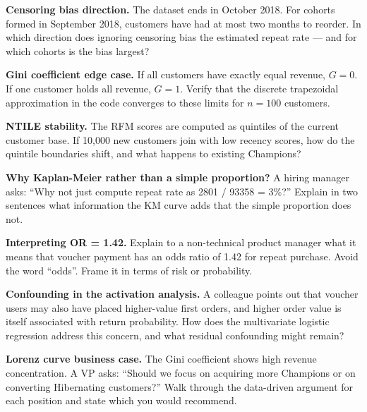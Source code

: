 \begin{challengebox}
\textbf{Censoring bias direction.} The dataset ends in October 2018. For cohorts
formed in September 2018, customers have had at most two months to reorder. In
which direction does ignoring censoring bias the estimated repeat rate --- and
for which cohorts is the bias largest?
\end{challengebox}

\begin{challengebox}
\textbf{Gini coefficient edge case.} If all customers have exactly equal revenue,
$G = 0$. If one customer holds all revenue, $G = 1$. Verify that the discrete
trapezoidal approximation in the code converges to these limits for $n = 100$
customers.
\end{challengebox}

\begin{challengebox}
\textbf{NTILE stability.} The RFM scores are computed as quintiles of the current
customer base. If 10,000 new customers join with low recency scores, how do the
quintile boundaries shift, and what happens to existing Champions?
\end{challengebox}

\begin{interviewbox}
\textbf{Why Kaplan-Meier rather than a simple proportion?} A hiring manager asks:
``Why not just compute repeat rate as 2801 / 93358 = 3\%?'' Explain in two sentences
what information the KM curve adds that the simple proportion does not.
\end{interviewbox}

\begin{interviewbox}
\textbf{Interpreting OR = 1.42.} Explain to a non-technical product manager what
it means that voucher payment has an odds ratio of 1.42 for repeat purchase.
Avoid the word ``odds''. Frame it in terms of risk or probability.
\end{interviewbox}

\begin{interviewbox}
\textbf{Confounding in the activation analysis.} A colleague points out that
voucher users may also have placed higher-value first orders, and higher order
value is itself associated with return probability. How does the multivariate
logistic regression address this concern, and what residual confounding might
remain?
\end{interviewbox}

\begin{interviewbox}
\textbf{Lorenz curve business case.} The Gini coefficient shows high revenue
concentration. A VP asks: ``Should we focus on acquiring more Champions or on
converting Hibernating customers?'' Walk through the data-driven argument for
each position and state which you would recommend.
\end{interviewbox}
